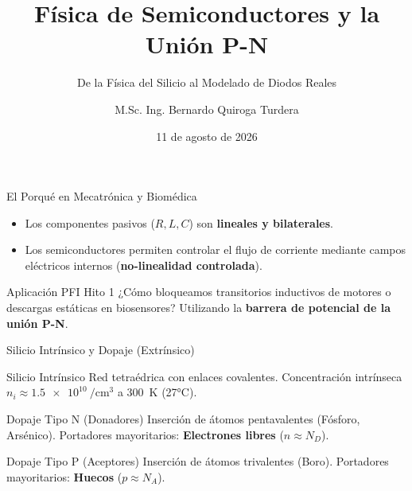 \documentclass[10pt, aspectratio=169]{beamer}
\title[Semiconductores y Diodos]{Física de Semiconductores y la Unión P-N}
\subtitle{De la Física del Silicio al Modelado de Diodos Reales}
\author[M.Sc. Bernardo Quiroga]{M.Sc. Ing. Bernardo Quiroga Turdera}
\institute[UCB Tarija]{Circuitos Electrónicos III (IMT-221) \\ UCB Tarija}
\date{11 de agosto de 2026}
\begin{document}
\begin{frame}
  \titlepage
\end{frame}

\begin{frame}{El Porqué en Mecatrónica y Biomédica}
  \begin{itemize}
      \item Los componentes pasivos ($R, L, C$) son \textbf{lineales y bilaterales}.
      \item Los semiconductores permiten controlar el flujo de corriente mediante campos eléctricos internos (\textbf{no-linealidad controlada}).
  \end{itemize}
  \vspace{0.3cm}
  \begin{alertblock}{Aplicación PFI Hito 1}
      ¿Cómo bloqueamos transitorios inductivos de motores o descargas estáticas en biosensores? Utilizando la \textbf{barrera de potencial de la unión P-N}.
  \end{alertblock}
\end{frame}

\begin{frame}{Silicio Intrínsico y Dopaje (Extrínsico)}
  \begin{block}{Silicio Intrínsico}
      Red tetraédrica con enlaces covalentes. Concentración intrínseca $n_i \approx \SI{1.5e10}{\per\centi\meter\cubed}$ a \SI{300}{\kelvin} (27°C).
  \end{block}
  
  \begin{block}{Dopaje Tipo N (Donadores)}
      Inserción de átomos pentavalentes (Fósforo, Arsénico). Portadores mayoritarios: \textbf{Electrones libres} ($n \approx N_D$).
  \end{block}

  \begin{block}{Dopaje Tipo P (Aceptores)}
      Inserción de átomos trivalentes (Boro). Portadores mayoritarios: \textbf{Huecos} ($p \approx N_A$).
  \end{block}
\end{frame}
\end{document}

